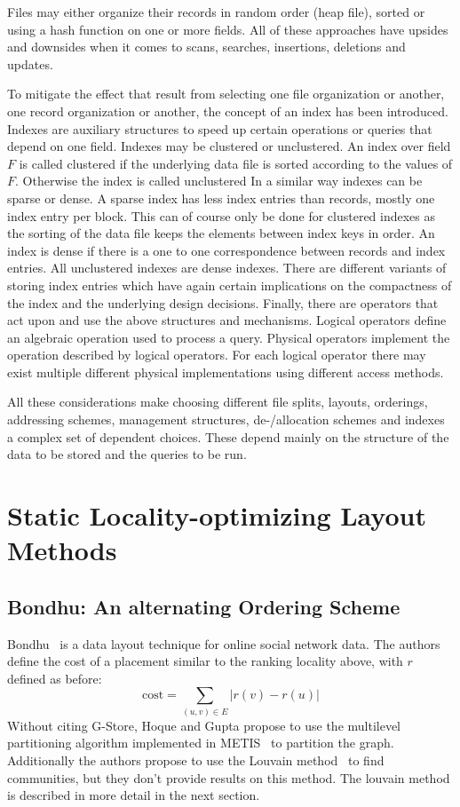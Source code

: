     Files may either organize their records in random order (heap file), sorted or using a hash function on one or more fields. 
    All of these approaches have upsides and downsides when it comes to scans, searches, insertions, deletions and updates. 

    To mitigate the effect that result from selecting one file organization or another, one record organization or another, the concept of an index has been introduced. 
    Indexes are auxiliary structures to speed up certain operations or queries that depend on one field. 
    Indexes may be clustered or unclustered. 
    An index over field $F$ is called clustered if the underlying data file is sorted according to the values of $F$. 
    Otherwise the index is called unclustered
    In a similar way indexes can be sparse or dense. 
    A sparse index has less index entries than records, mostly one index entry per block. 
    This can of course only be done for clustered indexes as the sorting of the data file keeps the elements between index keys in order. 
    An index is dense if there is a one to one correspondence between records and index entries. 
    All unclustered indexes are dense indexes.
    There are different variants of storing index entries which have again certain implications on the compactness of the index and the underlying design decisions.
    Finally, there are operators that act upon and use the above structures and mechanisms. 
    Logical operators define an algebraic operation used to process a query.
    Physical operators implement the operation described by logical operators. For each logical operator there may exist multiple different physical implementations using different access methods.

    All these considerations make choosing different file splits, layouts, orderings, addressing schemes, management structures, de-/allocation schemes and indexes a complex set of dependent choices. 
    These depend mainly on the structure of the data to be stored and the queries to be run.

\section{Static Locality-optimizing Layout Methods}
    \subsection*{Bondhu: An alternating Ordering Scheme}
    Bondhu~\autocite{hoque2012disk} is a data layout technique for online social network data. 
    The authors define the cost of a placement similar to the ranking locality above, with $r$ defined as before: \[ \text{cost} = \sum_{(u, v) \in E} |r(v) - r(u)| \]   
    Without citing G-Store, Hoque and Gupta propose to use the multilevel partitioning algorithm implemented in METIS~\autocite{karypis} to partition the graph. Additionally the authors propose to use the Louvain method~\autocite{blondel2008fast} to find communities, but they don't provide results on this method. The louvain method is described in more detail in the next section. \\
    

